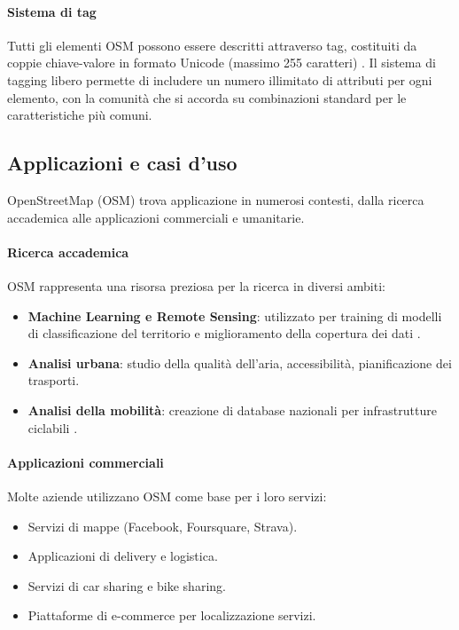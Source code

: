 \paragraph{Sistema di tag}
Tutti gli elementi OSM possono essere descritti attraverso tag, costituiti da coppie chiave-valore in formato Unicode (massimo 255 caratteri) \cite{mapfeatures2024}. Il sistema di tagging libero permette di includere un numero illimitato di attributi per ogni elemento, con la comunità che si accorda su combinazioni standard per le caratteristiche più comuni.

\subsection{Applicazioni e casi d'uso}

OpenStreetMap (OSM) trova applicazione in numerosi contesti, dalla ricerca accademica alle applicazioni commerciali e umanitarie.

\paragraph{Ricerca accademica}
OSM rappresenta una risorsa preziosa per la ricerca in diversi ambiti:
\begin{itemize}
\item \textbf{Machine Learning e Remote Sensing}: utilizzato per training di modelli di classificazione del territorio e miglioramento della copertura dei dati \cite{vargas2020}.
\item \textbf{Analisi urbana}: studio della qualità dell'aria, accessibilità, pianificazione dei trasporti.
\item \textbf{Analisi della mobilità}: creazione di database nazionali per infrastrutture ciclabili \cite{sfu2022}.
\end{itemize}

\paragraph{Applicazioni commerciali}
Molte aziende utilizzano OSM come base per i loro servizi:
\begin{itemize}
\item Servizi di mappe (Facebook, Foursquare, Strava).
\item Applicazioni di delivery e logistica.
\item Servizi di car sharing e bike sharing.
\item Piattaforme di e-commerce per localizzazione servizi.
\end{itemize}

